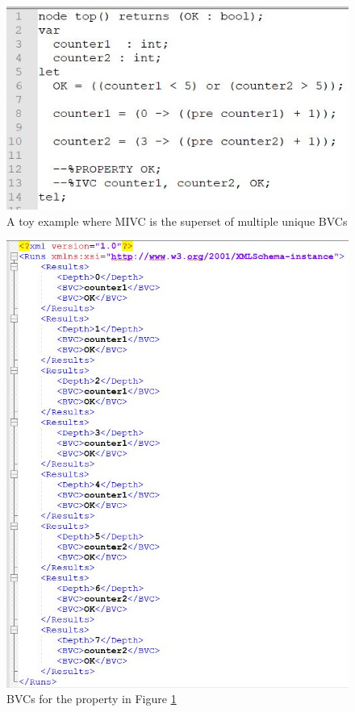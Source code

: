 \begin{figure}
 \centering
  \includegraphics[width=0.70\columnwidth]{figs/toybvc2.jpg}
  \caption{A toy example where MIVC is the superset of multiple unique BVCs}
  \vspace{0.1in}
  \label{fig:toybvc2}
\end{figure}

\begin{figure}
 \centering
  \includegraphics[width=0.8\columnwidth]{figs/toyo2.jpg}
  \caption{BVCs for the property in Figure \ref{fig:toybvc2}}
  \vspace{0.1in}
  \label{fig:toyo2}
\end{figure} 